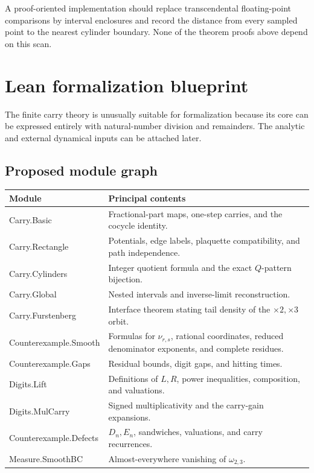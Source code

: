 \documentclass[11pt]{article}
\theoremstyle{definition}
\theoremstyle{remark}
\begin{document}
A proof-oriented implementation should replace transcendental floating-point
comparisons by interval enclosures and record the distance from every sampled point
to the nearest cylinder boundary.  None of the theorem proofs above depend on this
scan.

\section{Lean formalization blueprint}
\label{sec:lean-blueprint}

The finite carry theory is unusually suitable for formalization because its core can
be expressed entirely with natural-number division and remainders.  The analytic and
external dynamical inputs can be attached later.

\subsection{Proposed module graph}

\begin{center}
\begin{tabularx}{0.96\textwidth}{>{\ttfamily\raggedright\arraybackslash}p{}X}
\toprule
Module & Principal contents \\
\midrule
Carry.Basic & Fractional-part maps, one-step carries, and the cocycle identity.\\
Carry.Rectangle & Potentials, edge labels, plaquette compatibility, and path
independence.\\
Carry.Cylinders & Integer quotient formula and the exact $Q$-pattern bijection.\\
Carry.Global & Nested intervals and inverse-limit reconstruction.\\
Carry.Furstenberg & Interface theorem stating tail density of the $\times2,\times3$
orbit.\\
Counterexample.Smooth & Formulas for $\nu_{r,s}$, rational coordinates, reduced
denominator exponents, and complete residues.\\
Counterexample.Gaps & Residual bounds, digit gaps, and hitting times.\\
Digits.Lift & Definitions of $L,R$, power inequalities, composition, and valuations.\\
Digits.MulCarry & Signed multiplicativity and the carry-gain expansions.\\
Counterexample.Defects & $D_n,E_n$, sandwiches, valuations, and carry recurrences.\\
Measure.SmoothBC & Almost-everywhere vanishing of
$\omega_{2,3}$.\\
\bottomrule
\end{tabularx}
\end{center}
\end{document}

